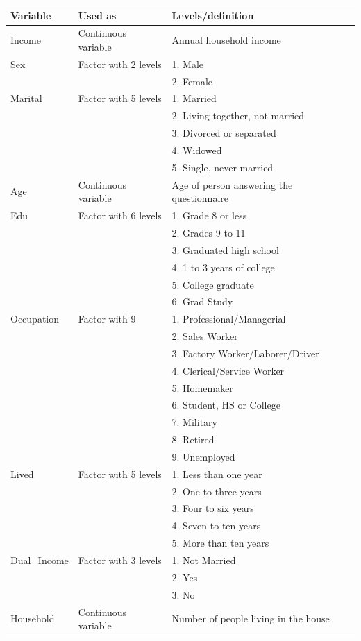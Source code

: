 \documentclass{article}
\begin{document}
\begin{table}[H]
\centering
\begin{tabular}{|l|l|l|}
\hline
\textbf{Variable} &\textbf{Used as} &\textbf{Levels/definition}\\
\hline
Income       &Continuous variable  & Annual household income\\
\hline
Sex          &Factor with 2 levels &1. Male \\
&&2. Female\\
\hline
Marital      &Factor with 5 levels &1. Married \\
&&2. Living together, not married \\
&&3. Divorced or separated \\
&&4. Widowed \\
&&5. Single, never married\\
\hline
Age          &Continuous variable  &Age of person answering the questionnaire\\
\hline
Edu          &Factor with 6 levels &1. Grade 8 or less \\
&&2. Grades 9 to 11 \\
&&3. Graduated high school \\
&&4. 1 to 3 years of college \\
&&5. College graduate \\
&&6. Grad Study\\
\hline
Occupation   &Factor with 9  &1. Professional/Managerial \\
&&2. Sales Worker \\
&&3. Factory Worker/Laborer/Driver \\
&&4. Clerical/Service Worker \\
&&5. Homemaker \\
&&6. Student, HS or College \\
&&7. Military \\
&&8. Retired \\
&&9. Unemployed\\
\hline
Lived        &Factor with 5 levels &1. Less than one year \\
&&2. One to three years \\
&&3. Four to six years \\
&&4. Seven to ten years \\
&&5. More than ten years\\
\hline
Dual\_Income &Factor with 3 levels &1. Not Married \\
&&2. Yes \\
&&3. No\\
\hline
Household    &Continuous variable  &Number of people living in the house\\
\hline
\end{tabular}
\end{table}
\end{document}
